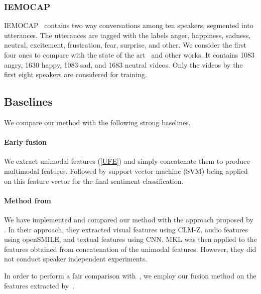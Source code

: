 \documentclass[review]{elsarticle}
\newcommand\?[1]{\hl{#1}}
\begin{document}
\subsubsection{IEMOCAP}
\label{sec:iemocap}
IEMOCAP~\citep{iemocap} contains two way conversations
among ten speakers, segmented into utterances. The utterances are tagged with
the labels anger, happiness, sadness, neutral, excitement, frustration, fear,
surprise, and other. We consider the first four ones to compare with the
state of the art~\citep{porcon} and other works. It contains 1083
angry, 1630 happy, 1083 sad, and 1683 neutral videos. Only the videos by the
first eight speakers are considered for training.

\subsection{Baselines}
We compare our method with the following strong baselines.

\paragraph{Early fusion}
\label{early-fusion}
We extract unimodal features (\cref{UFE}) and simply concatenate them to
produce multimodal features. Followed by support vector machine (SVM)
being applied on this feature vector for the final sentiment
classification.

\paragraph{Method from~\citep{pordee}}
We have implemented and compared our method with the approach proposed by
\citet{pordee}. In their approach, they extracted visual features using
CLM-Z, audio features using openSMILE, and textual features using CNN. MKL was then applied to the features obtained from
concatenation of the unimodal features. However, they did not conduct speaker
independent experiments.

In order to perform a fair comparison with~\citep{pordee}, we
employ our fusion method on the features extracted by~\citet{pordee}.

\end{document}
